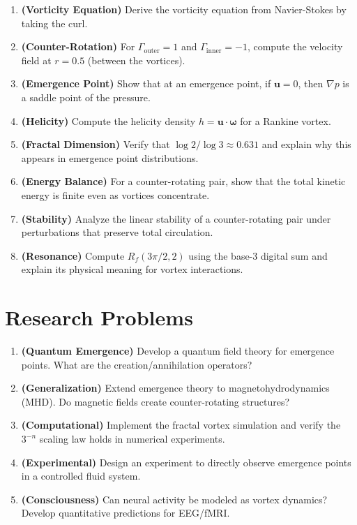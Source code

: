 \begin{enumerate}
\item \textbf{(Vorticity Equation)} Derive the vorticity equation from Navier-Stokes by taking the curl.

\item \textbf{(Counter-Rotation)} For $\Gamma_{\text{outer}} = 1$ and $\Gamma_{\text{inner}} = -1$, compute the velocity field at $r = 0.5$ (between the vortices).

\item \textbf{(Emergence Point)} Show that at an emergence point, if $\mathbf{u} = 0$, then $\nabla p$ is a saddle point of the pressure.

\item \textbf{(Helicity)} Compute the helicity density $h = \mathbf{u} \cdot \boldsymbol{\omega}$ for a Rankine vortex.

\item \textbf{(Fractal Dimension)} Verify that $\log 2 / \log 3 \approx 0.631$ and explain why this appears in emergence point distributions.

\item \textbf{(Energy Balance)} For a counter-rotating pair, show that the total kinetic energy is finite even as vortices concentrate.

\item \textbf{(Stability)} Analyze the linear stability of a counter-rotating pair under perturbations that preserve total circulation.

\item \textbf{(Resonance)} Compute $R_f(3\pi/2, 2)$ using the base-3 digital sum and explain its physical meaning for vortex interactions.
\end{enumerate}

\section*{Research Problems}

\begin{enumerate}
\item \textbf{(Quantum Emergence)} Develop a quantum field theory for emergence points. What are the creation/annihilation operators?

\item \textbf{(Generalization)} Extend emergence theory to magnetohydrodynamics (MHD). Do magnetic fields create counter-rotating structures?

\item \textbf{(Computational)} Implement the fractal vortex simulation and verify the $3^{-n}$ scaling law holds in numerical experiments.

\item \textbf{(Experimental)} Design an experiment to directly observe emergence points in a controlled fluid system.

\item \textbf{(Consciousness)} Can neural activity be modeled as vortex dynamics? Develop quantitative predictions for EEG/fMRI.
\end{enumerate}
